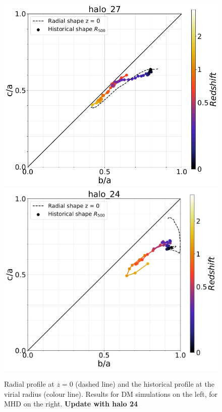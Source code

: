\documentclass[a4paper,fleqn,usenatbib]{mnras}
\begin{document}
\begin{figure}
  \includegraphics[width=\columnwidth]{./pics/Redshift/halo_27_DM_Z_correlation.png}
  \includegraphics[width=\columnwidth]{./pics/Redshift/halo_24_level3_MHD_Z_Triax.png}
  \caption{Radial profile at $z=0$ (dashed line) and 
    the historical profile at the virial radius (colour line). 
    Results for DM simulations on the left, for MHD on the right.{\bf
      Update with halo 24}}
  \label{fig:redshift_triaxial}
\end{figure}
\end{document}
